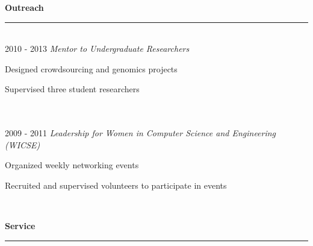 \documentclass[11pt]{article}
\newcommand{\parwidth}{5.3 in}
\newcommand{\tabwidth}{1.5 in}
\newcommand{\head}[1]{
{\bf #1} \\
\rule{\textwidth}{0.01 in}

\vspace{-0.35 in}

}
\begin{document}

\head{Outreach}

\begin{tabbing}
\hspace{\tabwidth} \= \\

2010 - 2013 \> \emph{Mentor to Undergraduate Researchers}\\
\> \parbox[t]{\parwidth}{
\begin{compactitem}
\item Designed crowdsourcing and genomics projects
\item Supervised three student researchers
\end{compactitem}
} \\ \\

2009 - 2011 \> \emph{Leadership for Women in Computer Science and Engineering (WICSE)} \\
\> \parbox[t]{\parwidth}{
\begin{compactitem}
\item Organized weekly networking events
\item Recruited and supervised volunteers to participate in events
\end{compactitem}
} \\

\end{tabbing}


\head{Service}
\end{document}
